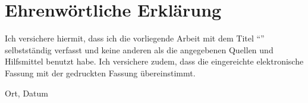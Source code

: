 \clearpage
\chapter*{Ehrenwörtliche Erklärung}


Ich versichere hiermit, dass ich die vorliegende Arbeit mit dem Titel \enquote{\textit{\DerTitelDerArbeit}} selbstständig verfasst und
keine anderen als die angegebenen Quellen und Hilfsmittel benutzt habe. Ich versichere zudem, dass die eingereichte elektronische
Fassung mit der gedruckten Fassung übereinstimmt.

\vspace{3cm}
Ort, Datum \hfill \DerAutorDerArbeit
